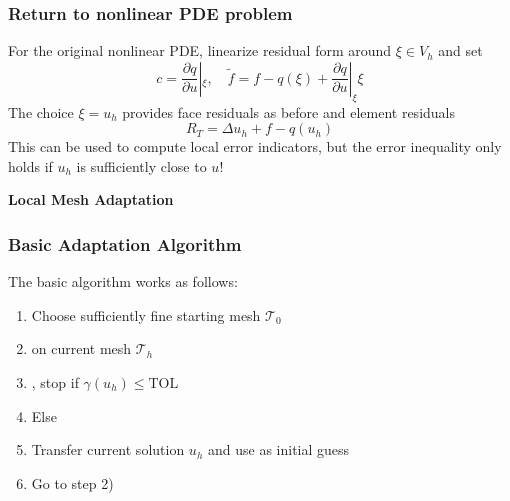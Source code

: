 \documentclass[aspectratio=169,11pt]{beamer}
\theoremstyle{definition}
\begin{document}
\begin{frame}
\frametitle{Return to nonlinear PDE problem}
For the original nonlinear PDE, linearize residual form around $\xi \in V_h$ and set
\begin{equation*}
  c = \frac{\partial q}{\partial u} |_\xi, \quad \tilde{f} = f - q(\xi) + \frac{\partial q}{\partial u} |_\xi \xi
\end{equation*}
The choice $\xi = u_h$ provides face residuals as before and element residuals
\begin{equation*}
  R_T = \Delta u_h + f - q(u_h)
\end{equation*}
This can be used to compute local error indicators, but the error inequality only
holds if $u_h$ is sufficiently close to $u$!
\end{frame}

\begin{frame}
\begin{center}
\Large\textbf{Local Mesh Adaptation}
\end{center}
\end{frame}

\begin{frame}
\frametitle{Basic Adaptation Algorithm}
The basic algorithm works as follows:
\begin{enumerate}
  \item Choose sufficiently fine starting mesh $\mathcal{T}_0$
  \item {} on current mesh $\mathcal{T}_h$
  \item {}, stop if $\gamma(u_h) \leq \text{TOL}$
  \item Else 
  \item Transfer current solution $u_h$ and use as initial guess
  \item Go to step 2)
\end{enumerate}
\end{frame}
\end{document}
